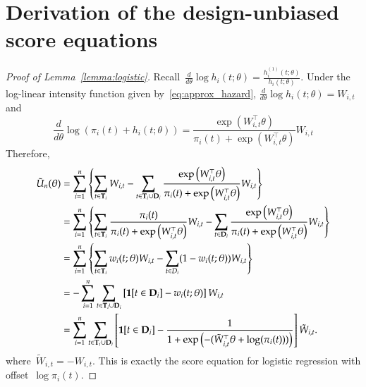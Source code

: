 \documentclass[12pt]{amsart}
\def\bfT{{\bf T}}
\def\bfD{{\bf D}}
\begin{document}



\newpage
\appendix

\section{Derivation of the design-unbiased score equations}

\begin{proof}[Proof of Lemma~\ref{lemma:logistic}]
Recall~$\frac{d}{d\theta} \log h_i (t; \theta) = \frac{h^{(1)}_i (t; \theta)}{h_i (t; \theta)}$. Under the log-linear intensity function given by~\eqref{eq:approx_hazard}, $\frac{d}{d\theta} \log h_i (t; \theta) = W_{i,t}$ and
\[
\frac{d}{d \theta} \log \left( \pi_i (t) + h_i (t;\theta) \right) =
\frac{\exp \left( W_{i,t}^\top \theta \right)}{\pi_i (t) + \exp
  \left( W_{i,t}^\top \theta \right)} W_{i,t}
\]
Therefore,
\begin{align*}
\tilde U_n (\theta)
  &= \sum_{i=1}^n \left \{ \sum_{t \in \bfT_i} W_{i,t} - \sum_{t \in \bfT_i \cup \bfD_i} \frac{\exp \left( W_{i,t}^\top \theta \right)}{\pi_i (t) + \exp \left( W_{i,t}^\top \theta \right)}  W_{i,t} \right \} \\
  &= \sum_{i=1}^n \left \{ \sum_{t \in \bfT_i} \frac{\pi_i (t)}{\pi_i (t) + \exp \left( W_{i,t}^\top \theta \right)} W_{i,t} - \sum_{t \in \bfD_i} \frac{\exp \left( W_{i,t}^\top \theta \right)}{\pi_i (t) + \exp \left( W_{i,t}^\top \theta \right)} W_{i,t} \right \} \\
  &= \sum_{i=1}^n \left \{ \sum_{t \in \bfT_i} w_{i} (t; \theta) W_{i,t} -
    \sum_{t \in D_i} (1 - w_i (t; \theta)) W_{i,t} \right \} \\
  &= - \sum_{i=1}^n \sum_{t \in \bfT_i \cup \bfD_i} \left[ {\bf 1} [t \in \bfD_i]  - w_{i} (t; \theta) \right] W_{i,t} \\
  &= \sum_{i=1}^n \sum_{t \in \bfT_i \cup \bfD_i}
    \left[ {\bf 1} [t \in \bfD_i]  - \frac{1}{1 + \exp\left( - (
          \tilde W_{i,t}^\top \theta + \log (\pi_i (t) ) ) \right)}
    \right] \tilde W_{i,t}.
\end{align*}
where~$\tilde W_{i,t} = - W_{i,t}$. This is exactly the score equation
for logistic regression with offset~$\log \pi_i (t)$.
\end{proof}
\end{document}
